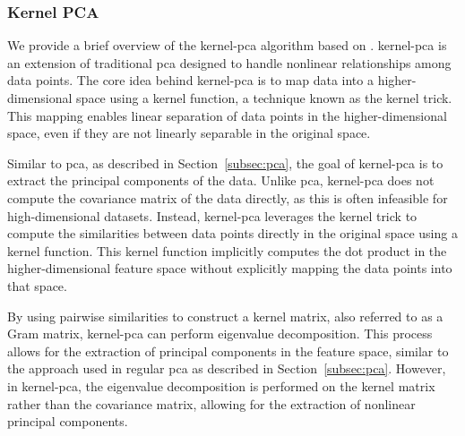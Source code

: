 \subsubsection{Kernel PCA}
We provide a brief overview of the \gls{kernel-pca} algorithm based on \citet{learningwithkernels}.
\gls{kernel-pca} is an extension of traditional \gls{pca} designed to handle nonlinear relationships among data points.
The core idea behind \gls{kernel-pca} is to map data into a higher-dimensional space using a kernel function, a technique known as the kernel trick.
This mapping enables linear separation of data points in the higher-dimensional space, even if they are not linearly separable in the original space.

Similar to \gls{pca}, as described in Section~\ref{subsec:pca}, the goal of \gls{kernel-pca} is to extract the principal components of the data.
Unlike \gls{pca}, \gls{kernel-pca} does not compute the covariance matrix of the data directly, as this is often infeasible for high-dimensional datasets.
Instead, \gls{kernel-pca} leverages the kernel trick to compute the similarities between data points directly in the original space using a kernel function.
This kernel function implicitly computes the dot product in the higher-dimensional feature space without explicitly mapping the data points into that space.

By using pairwise similarities to construct a kernel matrix, also referred to as a Gram matrix, \gls{kernel-pca} can perform eigenvalue decomposition.
This process allows for the extraction of principal components in the feature space, similar to the approach used in regular \gls{pca} as described in Section~\ref{subsec:pca}.
However, in \gls{kernel-pca}, the eigenvalue decomposition is performed on the kernel matrix rather than the covariance matrix, allowing for the extraction of nonlinear principal components.